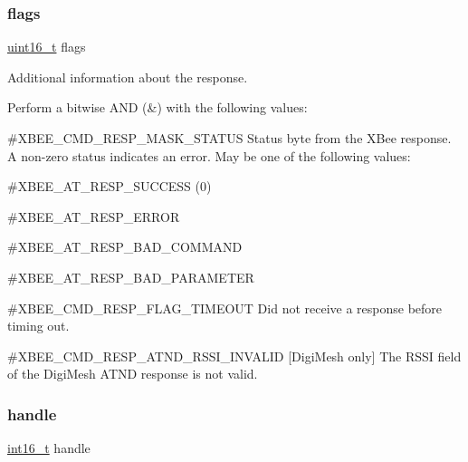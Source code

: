 \subsubsection{\texorpdfstring{flags}{flags}}
{\footnotesize\ttfamily \hyperlink{group__hal__dos_ga5a8b2dc9e45a9ee81a94ef304fb62505}{uint16\+\_\+t} flags}



Additional information about the response. 

Perform a bitwise A\+ND (\&) with the following values\+:


\begin{DoxyItemize}
\item \#\+X\+B\+E\+E\+\_\+\+C\+M\+D\+\_\+\+R\+E\+S\+P\+\_\+\+M\+A\+S\+K\+\_\+\+S\+T\+A\+T\+US Status byte from the X\+Bee response. A non-\/zero status indicates an error. May be one of the following values\+:
\begin{DoxyItemize}
\item \#\+X\+B\+E\+E\+\_\+\+A\+T\+\_\+\+R\+E\+S\+P\+\_\+\+S\+U\+C\+C\+E\+SS (0)
\item \#\+X\+B\+E\+E\+\_\+\+A\+T\+\_\+\+R\+E\+S\+P\+\_\+\+E\+R\+R\+OR
\item \#\+X\+B\+E\+E\+\_\+\+A\+T\+\_\+\+R\+E\+S\+P\+\_\+\+B\+A\+D\+\_\+\+C\+O\+M\+M\+A\+ND
\item \#\+X\+B\+E\+E\+\_\+\+A\+T\+\_\+\+R\+E\+S\+P\+\_\+\+B\+A\+D\+\_\+\+P\+A\+R\+A\+M\+E\+T\+ER
\end{DoxyItemize}
\item \#\+X\+B\+E\+E\+\_\+\+C\+M\+D\+\_\+\+R\+E\+S\+P\+\_\+\+F\+L\+A\+G\+\_\+\+T\+I\+M\+E\+O\+UT Did not receive a response before timing out.
\item \#\+X\+B\+E\+E\+\_\+\+C\+M\+D\+\_\+\+R\+E\+S\+P\+\_\+\+A\+T\+N\+D\+\_\+\+R\+S\+S\+I\+\_\+\+I\+N\+V\+A\+L\+ID \mbox{[}Digi\+Mesh only\mbox{]} The R\+S\+SI field of the Digi\+Mesh A\+T\+ND response is not valid. 
\end{DoxyItemize}\mbox{\label{structxbee__cmd__response__t_a1542542d7a68344e5d31df924a254df4}} 
\subsubsection{\texorpdfstring{handle}{handle}}
{\footnotesize\ttfamily \hyperlink{group__hal__dos_ga2140805d08462d474b82ddc8d1c2f3e6}{int16\+\_\+t} handle}




